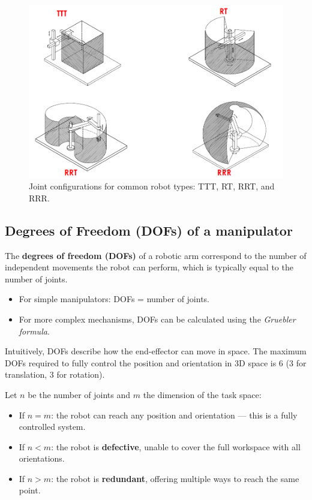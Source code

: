 \begin{figure}[H]
  \centering
  \includegraphics[width=0.8\linewidth]{imgs/joint_configurations.png}
  \caption{Joint configurations for common robot types: TTT, RT, RRT, and RRR.}
\end{figure}

\hfill

\subsection{Degrees of Freedom (DOFs) of a manipulator}

The \textbf{degrees of freedom (DOFs)} of a robotic arm correspond to the number of independent movements the robot can perform, which is typically equal to the number of joints.

\begin{itemize}
  \item For simple manipulators: DOFs = number of joints.
  \item For more complex mechanisms, DOFs can be calculated using the \textit{Gruebler formula}.
\end{itemize}

Intuitively, DOFs describe how the end-effector can move in space. The maximum DOFs required to fully control the position and orientation in 3D space is 6 (3 for translation, 3 for rotation).

Let $n$ be the number of joints and $m$ the dimension of the task space:
\begin{itemize}
  \item If $n = m$: the robot can reach any position and orientation — this is a fully controlled system.
  \item If $n < m$: the robot is \textbf{defective}, unable to cover the full workspace with all orientations.
  \item If $n > m$: the robot is \textbf{redundant}, offering multiple ways to reach the same point.
\end{itemize}

